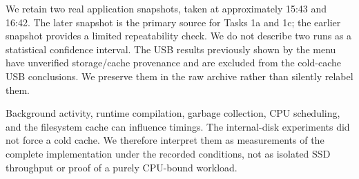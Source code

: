 We retain two real application snapshots, taken at approximately 15:43 and 16:42. The later snapshot is the primary source for Tasks 1a and 1c; the earlier snapshot provides a limited repeatability check. We do not describe two runs as a statistical confidence interval. The USB results previously shown by the menu have unverified storage/cache provenance and are excluded from the cold-cache USB conclusions. We preserve them in the raw archive rather than silently relabel them.

Background activity, runtime compilation, garbage collection, CPU scheduling, and the filesystem cache can influence timings. The internal-disk experiments did not force a cold cache. We therefore interpret them as measurements of the complete implementation under the recorded conditions, not as isolated SSD throughput or proof of a purely CPU-bound workload.

